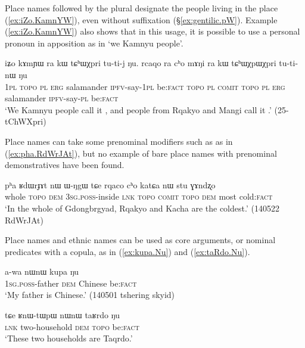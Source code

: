  
Place names followed by the plural  designate the people living in the place (\ref{ex:iZo.KamnYW}), even without  suffixation (§\ref{ex:gentilic.pW}). Example (\ref{ex:iZo.KamnYW}) also shows that in this usage, it is possible to use a personal pronoun in apposition as in  `we Kamnyu people'.

\begin{exe}
\ex \label{ex:iZo.KamnYW}
 \gll iʑo kɤmɲɯ ra kɯ tɕʰɯχpri tu-ti-j ŋu. rcaqo ra cʰo mɤŋi ra kɯ tɕʰɯχpɯχpri tu-ti-nɯ ŋu \\
 \textsc{1pl} \textsc{topo} \textsc{pl} \textsc{erg} salamander \textsc{ipfv}-say-\textsc{1pl} be:\textsc{fact} \textsc{topo} \textsc{pl} \textsc{comit} \textsc{topo} \textsc{pl} \textsc{erg} salamander \textsc{ipfv}-say-\textsc{pl} be:\textsc{fact} \\
 \glt `We Kamnyu people call it , and people from Rqakyo and Mangi call it .' (25-tChWXpri)
\end{exe}

Place names can take some prenominal modifiers such as  as in (\ref{ex:pha.RdWrJAt}), but no example of bare place names with prenominal demonstratives have been found. 

\begin{exe}
\ex \label{ex:pha.RdWrJAt}
 \gll pʰa ʁdɯrɟɤt nɯ ɯ-ŋgɯ tɕe rqaco cʰo katɕa nɯ stu ɣɤndʐo \\
 whole \textsc{topo} \textsc{dem} \textsc{3sg}.\textsc{poss}-inside \textsc{lnk} \textsc{topo} \textsc{comit} \textsc{topo} \textsc{dem} most cold:\textsc{fact} \\
 \glt `In the whole of Gdongbrgyad, Rqakyo and Kacha are the coldest.' (140522 RdWrJAt)
\end{exe}

Place names and ethnic names can be used as core arguments, or nominal predicates with a copula, as in (\ref{ex:kupa.Nu}) and (\ref{ex:taRdo.Nu}).

\begin{exe}
\ex \label{ex:kupa.Nu}
\gll a-wa nɯnɯ kupa ŋu \\
\textsc{1sg}.\textsc{poss}-father \textsc{dem} Chinese be:\textsc{fact} \\
\glt `My father is Chinese.' (140501 tshering skyid) 
\end{exe}

\begin{exe}
\ex \label{ex:taRdo.Nu}
\gll tɕe ʁnɯ-tɯpɯ nɯnɯ taʁrdo ŋu \\
\textsc{lnk} two-household \textsc{dem} \textsc{topo} be:\textsc{fact} \\
\glt `These two households are Taqrdo.' 
\end{exe}

